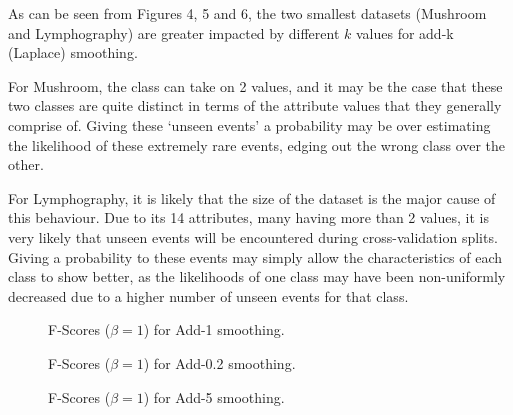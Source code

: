 \documentclass[11pt]{article}
\begin{document}
    As can be seen from Figures 4, 5 and 6, the two smallest datasets (Mushroom and Lymphography) are greater impacted by different $k$ values for add-k (Laplace) smoothing.

    For Mushroom, the class can take on 2 values, and it may be the case that these two classes are quite distinct in terms of the attribute values that they generally comprise of.
    Giving these `unseen events' a probability may be over estimating the likelihood of these extremely rare events, edging out the wrong class over the other.

    For Lymphography, it is likely that the size of the dataset is the major cause of this behaviour. Due to its 14 attributes, many having more than 2 values, it is very likely that unseen events
    will be encountered during cross-validation splits. Giving a probability to these events may simply allow the characteristics of each class to show better, as the likelihoods of one class may have been non-uniformly decreased due to a higher number of unseen events for that class.
    \begin{figure}[H]
        \centering
        \def\svgwidth{\columnwidth}
        \fbox{\scalebox{0.8}{}}
        \caption{F-Scores ($\beta = 1$) for Add-1 smoothing.}
        \label{fig:q5-add-1}
    \end{figure}
    \begin{figure}[H]
        \centering
        \def\svgwidth{\columnwidth}
        \fbox{\scalebox{0.8}{}}
        \caption{F-Scores ($\beta = 1$) for Add-0.2 smoothing.}
        \label{fig:q5-add-0.2}
    \end{figure}
    \begin{figure}[H]
        \centering
        \def\svgwidth{\columnwidth}
        \fbox{\scalebox{0.8}{}}
        \caption{F-Scores ($\beta = 1$) for Add-5 smoothing.}
        \label{fig:q5-add-5}
    \end{figure}
\end{document}
